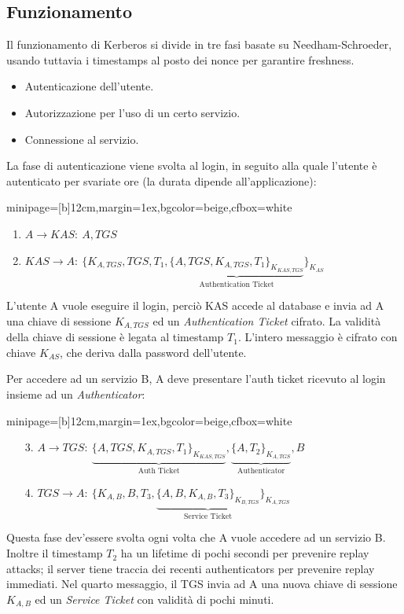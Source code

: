 \documentclass[a4paper, 11pt, twoside, openright, fleqn]{report}
\newcommand{\fromto}[2]{#1\rightarrow #2\!:\ }
\newenvironment{colbox}[2]%
{%
	\par\noindent\hspace{10pt}
	\begin{adjustbox}{minipage=[b]{#2},margin=1ex,bgcolor=#1,cfbox=white}
}{%
	\end{adjustbox}\newline%
}
\begin{document}
\subsection{Funzionamento}
Il funzionamento di Kerberos si divide in tre fasi basate su Needham-Schroeder, usando tuttavia i timestamps al posto dei nonce per garantire freshness.
\begin{itemize}
	\item Autenticazione dell'utente.
	\item Autorizzazione per l'uso di un certo servizio.
	\item Connessione al servizio.
\end{itemize}
La fase di autenticazione viene svolta al login, in seguito alla quale l'utente è autenticato per svariate ore (la durata dipende all'applicazione):
\begin{colbox}{beige}{12cm}
	\begin{enumerate}
		\item $\fromto{A}{KAS}A,TGS$
		\item $\fromto{KAS}{A}\{K_{A,T\!G\!S},TGS,T_1,
		\underbrace{\{A,TGS,K_{A,T\!G\!S},T_1\}_{K_{K\!A\!S,T\!G\!S}}}_{\mbox{Authentication Ticket}}\}_{K_{AS}}$
	\end{enumerate}
\end{colbox}
L'utente A vuole eseguire il login, perciò KAS accede al database e invia ad A una chiave di sessione $K_{A,TGS}$ ed un \emph{Authentication Ticket} cifrato.
La validità della chiave di sessione è legata al timestamp $T_1$. L'intero messaggio è cifrato con chiave $K_{AS}$, che deriva dalla password dell'utente.

Per accedere ad un servizio B, A deve presentare l'auth ticket ricevuto al login insieme ad un \emph{Authenticator}:
\begin{colbox}{beige}{12cm}
	\begin{enumerate}
		\item[3.] $\fromto{A}{TGS}\underbrace{\{A,TGS,K_{A,T\!G\!S},T_1\}_{K_{K\!A\!S,T\!G\!S}}}_{\mbox{Auth Ticket}}, \underbrace{\{A,T_2\}_{K_{A,T\!G\!S}}}_{\mbox{Authenticator}}, B$
		\item[4.] $\fromto{TGS}{A}\{K_{A,B},B,T_3,\underbrace{\{A,B,K_{A,B},T_3\}_{K_{B,T\!G\!S}}}_{\mbox{Service Ticket}}\}_{K_{A,T\!G\!S}}$
	\end{enumerate}
\end{colbox}
Questa fase dev'essere svolta ogni volta che A vuole accedere ad un servizio B. Inoltre il timestamp $T_2$ ha un lifetime di pochi secondi per prevenire replay attacks; il server tiene traccia dei recenti authenticators per prevenire replay immediati. Nel quarto messaggio, il TGS invia ad A una nuova chiave di sessione $K_{A,B}$ ed un \emph{Service Ticket} con validità di pochi minuti.
\end{document}
